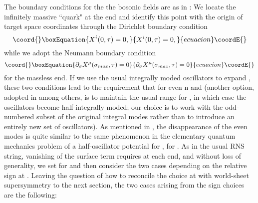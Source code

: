 \documentclass[a4paper,a4paper]{article}
\begin{document}
The boundary conditions for the the bosonic fields are as in
\cite{Gursoy}: We locate the infinitely massive ``quark" at the
\coordHE{} end and identify this point with the origin of target
space coordinates through the Dirichlet boundary condition
\begin{equation}\coord{}\boxEquation{
X^{i}(0, \tau)=0,
}{
X^{i}(0, \tau)=0,
}{ecuacion}\coordE{}\end{equation}
while we adopt the Neumann boundary condition
\begin{equation}\coord{}\boxEquation{
\partial_{\sigma}X^{\mu}(\sigma_{max}, \tau)=0
}{
\partial_{\sigma}X^{\mu}(\sigma_{max}, \tau)=0
}{ecuacion}\coordE{}\end{equation}
for the massless end.  If we use the usual integrally moded
oscillators to expand \coordHE{}, these two conditions lead to the
requirement that \coordHE{} for even n and
\coordHE{} (another option, adopted in \cite{Fair} among others,
is to maintain the usual range \myHighlight{$[0,\pi]$}\coordHE{} for \myHighlight{$\sigma$}\coordHE{}, in which case the
\coordHE{} oscillators become half-integrally moded; our
choice is to work with the odd-numbered subset of the original
integral modes rather than to introduce an entirely new set of
oscillators). As mentioned in \cite{Gursoy}, the disappearance of the
even modes is quite similar to the same phenomenon in the
elementary quantum mechanics problem of a half-oscillator
potential \coordHE{} for \coordHE{}, \coordHE{} for \coordHE{}. As in the usual RNS string, vanishing of the surface term
requires \myHighlight{$\Psi_{+}^{\mu}=\pm\Psi_{-}^{\mu}$}\coordHE{} at each end, and
without loss of generality, we set \coordHE{} for \coordHE{} and then consider the
two cases depending on the relative sign at \coordHE{}.
Leaving the question of how to reconcile the choice at \coordHE{}
with world-sheet supersymmetry to the next section, the two cases
arising from the sign choices are the following:
\end{document}
